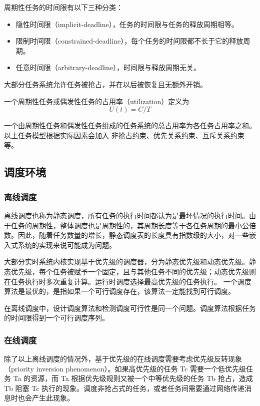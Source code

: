 周期性任务的时间限有以下三种分类：
\begin{itemize}
  \item 隐性时间限（implicit-deadline），任务的时间限与任务的释放周期相等。
  \item 限制时间限（constrained-deadline），每个任务的时间限都不长于它的释放周期。
  \item 任意时间限（arbitrary-deadline），时间限与释放周期无关。
\end{itemize}

大部分任务系统允许任务被抢占，并在以后被恢复且无额外开销。

一个周期性任务或偶发性任务的占用率（utilization）定义为
\begin{equation}
  U(t) = C/T
\end{equation}

一个由周期性任务和偶发性任务组成的任务系统的总占用率为各任务占用率之和。
以上任务模型根据实际因素会加入 非抢占约束、优先关系约束、互斥关系约束等。

\subsection{调度环境}

\subsubsection{离线调度}

离线调度也称为静态调度，所有任务的执行时间都认为是最坏情况的执行时间。由于任务的周期性，整体调度也是周期性的，其周期长度等于各任务周期的最小公倍数。因此，随着任务数量的增长，静态调度表的长度具有指数级的大小，对一些嵌入式系统的实现来说可能成为问题。

大部分实时系统内核实现基于优先级的调度器，分为静态优先级和动态优先级。静态优先级，每个任务被赋予一个固定，且与其他任务不同的优先级；动态优先级则在任务执行时多次重复计算。运行时调度选择最高优先级的任务执行。
一个调度算法是最优的，是指如果一个可行调度存在，该算法一定能找到可行调度。

在离线调度中，设计调度算法和检测调度可行性是同一个问题。调度算法根据任务的时间限得到一个可行调度序列。

\subsubsection{在线调度}

除了以上离线调度的情况外，基于优先级的在线调度需要考虑优先级反转现象（priority inversion phenomenon）。如果高优先级的任务 Tc 需要一个低优先级任务 Ta 的资源，而 Ta 根据优先级规则又被一个中等优先级的任务 Tb 抢占，造成 Tb 阻塞 Tc 执行的现象。调度非抢占式的任务，或者任务间需要通过网络传递消息时也会产生此现象。

